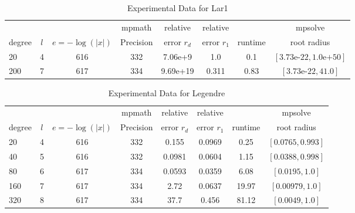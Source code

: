 \documentclass[sigconf]{acmart}
\begin{document}
\begin{table}[t]
\caption{Experimental Data for Lar1}
\label{tab:lar1}
\vskip -0.15in
\begin{center}
\begin{small}
\begin{sc}
\begin{tabular}{lccccccc}
\toprule
&  &  & mpmath & relative  & relative &  & mpsolve \\
degree  & $l$& $e=-\log(|x|)$& Precision &error $r_d$       & error $r_1$ &runtime& root radius\\
\midrule
 20 & 4 & 616 & 332 & 7.06e+9 & 1.0 & 0.1 & $[3.73\text{e-}22, 1.0\text{e+}50]$\\
 200 & 7 & 617 & 334 & 9.69e+19 & 0.311 & 0.83 & $[3.73\text{e-}22, 41.0]$\\
\bottomrule
\end{tabular}
\end{sc}
\end{small}
\end{center}
\vskip 0.05in
\end{table}

\begin{table}[t]
\caption{Experimental Data for Legendre}
\label{tab:legendre}
\vskip -0.15in
\begin{center}
\begin{small}
\begin{sc}
\begin{tabular}{lccccccc}
\toprule
&  &  & mpmath & relative  & relative &  & mpsolve \\
degree  & $l$& $e=-\log(|x|)$& Precision &error $r_d$       & error $r_1$ &runtime& root radius\\
\midrule
 20 & 4 & 616 & 332 & 0.155 & 0.0969 & 0.25 & $[0.0765, 0.993]$\\
 40 & 5 & 616 & 332 & 0.0981 & 0.0604 & 1.15 & $[0.0388, 0.998]$\\
 80 & 6 & 617 & 334 & 0.0593 & 0.0359 & 6.08 & $[0.0195, 1.0]$\\
  160 & 7 & 617 & 334 & 2.72 & 0.0637 & 19.97 & $[0.00979, 1.0]$\\
 320 & 8 & 617 & 334 & 37.7 & 0.456 & 81.12 & $[0.0049, 1.0]$\\
\bottomrule
\end{tabular}
\end{sc}
\end{small}
\end{center}
\vskip 0.05in
\end{table}
\end{document}
